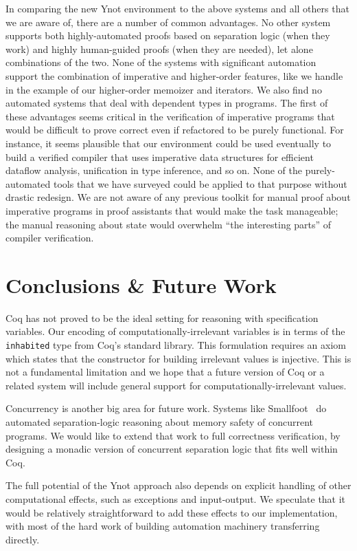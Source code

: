 \documentclass[preprint,nocopyrightspace]{sigplanconf}
\newcommand{\cd}[1]{\texttt{#1}}
\begin{document}
{In comparing the new Ynot environment to the above systems and all others that we are aware of, there are a number of common advantages.  No other system supports both highly-automated proofs based on separation logic (when they work) and highly human-guided proofs (when they are needed), let alone combinations of the two.  None of the systems with significant automation support the combination of imperative and higher-order features, like we handle in the example of our higher-order memoizer and iterators.  We also find no automated systems that deal with dependent types in programs.  The first of these advantages seems critical in the verification of imperative programs that would be difficult to prove correct even if refactored to be purely functional.  For instance, it seems plausible that our environment could be used eventually to build a verified compiler that uses imperative data structures for efficient dataflow analysis, unification in type inference, and so on.  None of the purely-automated tools that we have surveyed could be applied to that purpose without drastic redesign.  We are not aware of any previous toolkit for manual proof about imperative programs in proof assistants that would make the task manageable; the manual reasoning about state would overwhelm ``the interesting parts'' of compiler verification.


\section{Conclusions \& Future Work}

Coq has not proved to be the ideal setting for reasoning with specification variables.  Our encoding of computationally-irrelevant variables is in terms of the \cd{inhabited} type from Coq's standard library. This formulation requires an axiom which states that the constructor for building irrelevant values is injective.  This is not a fundamental limitation and we hope that a future version of Coq or a related system will include general support for computationally-irrelevant values.

Concurrency is another big area for future work.  Systems like Smallfoot~\cite{smallfoot} do automated separation-logic reasoning about memory safety of concurrent programs.  We would like to extend that work to full correctness verification, by designing a monadic version of concurrent separation logic that fits well within Coq.

The full potential of the Ynot approach also depends on explicit handling of other computational effects, such as exceptions and input-output.  We speculate that it would be relatively straightforward to add these effects to our implementation, with most of the hard work of building automation machinery transferring directly.

}
\end{document}
